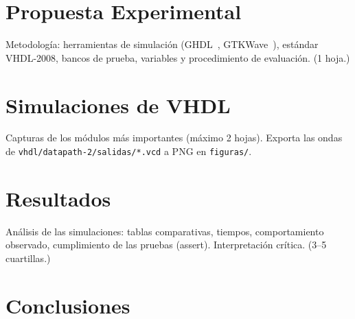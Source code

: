 \documentclass[llncs]{llncs}
\begin{document}
\section{Propuesta Experimental}
\label{sec:propuesta}

Metodología: herramientas de simulación (GHDL~\cite{ghdl-docs},
GTKWave~\cite{gtkwave-docs}), estándar VHDL-2008, bancos
de prueba, variables y procedimiento de evaluación. (1 hoja.)

\section{Simulaciones de VHDL}
\label{sec:simulaciones}

Capturas de los módulos más importantes (máximo 2 hojas). Exporta las ondas
de \texttt{vhdl/datapath-2/salidas/*.vcd} a PNG en \texttt{figuras/}.


\section{Resultados}
\label{sec:resultados}

Análisis de las simulaciones: tablas comparativas, tiempos, comportamiento
observado, cumplimiento de las pruebas (assert). Interpretación crítica.
(3--5 cuartillas.)

\section{Conclusiones}
\label{sec:conclusiones}
\end{document}
